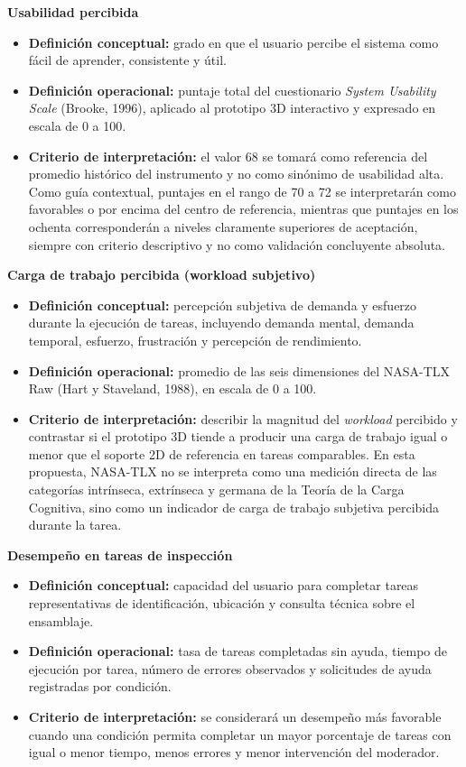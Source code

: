 \textbf{Usabilidad percibida}
\begin{itemize}
    \item \textbf{Definici\'on conceptual:} grado en que el usuario percibe el sistema como f\'acil de aprender, consistente y \'util.
    \item \textbf{Definici\'on operacional:} puntaje total del cuestionario \textit{System Usability Scale} (Brooke, 1996), aplicado al prototipo 3D interactivo y expresado en escala de 0 a 100.
    \item \textbf{Criterio de interpretaci\'on:} el valor 68 se tomar\'a como referencia del promedio hist\'orico del instrumento y no como sin\'onimo de usabilidad alta. Como gu\'ia contextual, puntajes en el rango de 70 a 72 se interpretar\'an como favorables o por encima del centro de referencia, mientras que puntajes en los ochenta corresponder\'an a niveles claramente superiores de aceptaci\'on, siempre con criterio descriptivo y no como validaci\'on concluyente absoluta.
\end{itemize}

\textbf{Carga de trabajo percibida (workload subjetivo)}
\begin{itemize}
    \item \textbf{Definici\'on conceptual:} percepci\'on subjetiva de demanda y esfuerzo durante la ejecuci\'on de tareas, incluyendo demanda mental, demanda temporal, esfuerzo, frustraci\'on y percepci\'on de rendimiento.
    \item \textbf{Definici\'on operacional:} promedio de las seis dimensiones del NASA-TLX Raw (Hart y Staveland, 1988), en escala de 0 a 100.
    \item \textbf{Criterio de interpretaci\'on:} describir la magnitud del \textit{workload} percibido y contrastar si el prototipo 3D tiende a producir una carga de trabajo igual o menor que el soporte 2D de referencia en tareas comparables. En esta propuesta, NASA-TLX no se interpreta como una medici\'on directa de las categor\'ias intr\'inseca, extr\'inseca y germana de la Teor\'ia de la Carga Cognitiva, sino como un indicador de carga de trabajo subjetiva percibida durante la tarea.
\end{itemize}

\textbf{Desempe\~no en tareas de inspecci\'on}
\begin{itemize}
    \item \textbf{Definici\'on conceptual:} capacidad del usuario para completar tareas representativas de identificaci\'on, ubicaci\'on y consulta t\'ecnica sobre el ensamblaje.
    \item \textbf{Definici\'on operacional:} tasa de tareas completadas sin ayuda, tiempo de ejecuci\'on por tarea, n\'umero de errores observados y solicitudes de ayuda registradas por condici\'on.
    \item \textbf{Criterio de interpretaci\'on:} se considerar\'a un desempe\~no m\'as favorable cuando una condici\'on permita completar un mayor porcentaje de tareas con igual o menor tiempo, menos errores y menor intervenci\'on del moderador.
\end{itemize}


